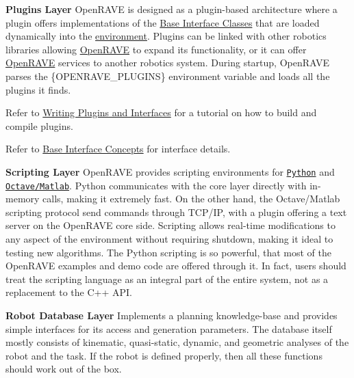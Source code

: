 \begin{DoxyItemize}
\item {\bfseries Plugins Layer} OpenRAVE is designed as a plugin-\/based architecture where a plugin offers implementations of the \hyperlink{group__interfaces}{Base Interface Classes} that are loaded dynamically into the \hyperlink{classOpenRAVE_1_1EnvironmentBase}{environment}. Plugins can be linked with other robotics libraries allowing \hyperlink{namespaceOpenRAVE}{OpenRAVE} to expand its functionality, or it can offer \hyperlink{namespaceOpenRAVE}{OpenRAVE} services to another robotics system. During startup, OpenRAVE parses the \{OPENRAVE\_\-PLUGINS\} environment variable and loads all the plugins it finds.
\begin{DoxyItemize}
\item Refer to \hyperlink{writing__plugins}{Writing Plugins and Interfaces} for a tutorial on how to build and compile plugins.
\item Refer to \hyperlink{interface__concepts}{Base Interface Concepts} for interface details.
\end{DoxyItemize}
\end{DoxyItemize}


\begin{DoxyItemize}
\item {\bfseries Scripting Layer} OpenRAVE provides scripting environments for \href{http://openrave.org/en/main/tutorials/openravepy_beginning.html#openravepy-beginning}{\tt Python} and \href{http://openrave.org/wiki/index.php/OctaveMATLAB}{\tt Octave/Matlab}. Python communicates with the core layer directly with in-\/memory calls, making it extremely fast. On the other hand, the Octave/Matlab scripting protocol send commands through TCP/IP, with a plugin offering a text server on the OpenRAVE core side. Scripting allows real-\/time modifications to any aspect of the environment without requiring shutdown, making it ideal to testing new algorithms. The Python scripting is so powerful, that most of the OpenRAVE examples and demo code are offered through it. In fact, users should treat the scripting language as an integral part of the entire system, not as a replacement to the C++ API.
\end{DoxyItemize}


\begin{DoxyItemize}
\item {\bfseries Robot Database Layer} Implements a planning knowledge-\/base and provides simple interfaces for its access and generation parameters. The database itself mostly consists of kinematic, quasi-\/static, dynamic, and geometric analyses of the robot and the task. If the robot is defined properly, then all these functions should work out of the box.
\end{DoxyItemize}

